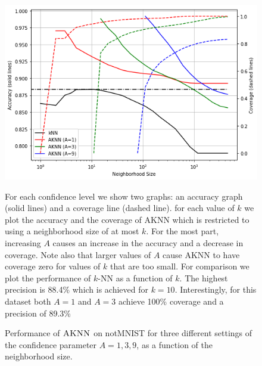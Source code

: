 \documentclass{article}
\newcommand{\algname}{\textsc{AKNN}}
\begin{document}
\begin{figure}[th]
    \begin{minipage}{0.52\textwidth}
    \centering
        \includegraphics[width=\linewidth]{figs/notMNIST/notMNIST_combinedGraphs.png}
        \caption{\small Performance of $\algname$ on notMNIST for three different
          settings of the confidence parameter $A=1,3,9$, as a
          function of the neighborhood size.}
      \end{minipage}
      \hspace{0.2cm}
      \begin{minipage}{0.46\textwidth}
        \begin{small}
          For each confidence level we show two graphs: an accuracy
          graph (solid lines) and a coverage line (dashed line). for
          each value of $k$ we plot the accuracy and the coverage of
          AKNN which is restricted to using a neighborhood size of at
          most $k$. For the most part, increasing $A$ causes an
          increase in the accuracy and a decrease in coverage. Note
          also that larger values of $A$ cause AKNN to have coverage
          zero for values of $k$ that are too small. For comparison we
          plot the performance of $k$-NN as a function of $k$. The
          highest precision is 88.4\% which is achieved for
          $k=10$. Interestingly, for this dataset both $A=1$ and $A=3$
          achieve 100\% coverage and a precision of 89.3\%          
          \end{small}
      \end{minipage}  
  \label{fig:aknnvsknn}
\end{figure}
\end{document}
